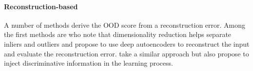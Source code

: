 \paragraph{Reconstruction-based}
%
A number of methods derive the OOD score from a reconstruction error. 
Among the first methods are \textcite{sakurada_anomaly_2014, lyudchik_outlier_2016} who note that dimensionality reduction helps separate inliers and outliers and propose to use deep autoencoders to reconstruct the input and evaluate the reconstruction error. \textcite{xia_learning_2015} take a similar approach but also propose to inject discriminative information in the learning process. 
